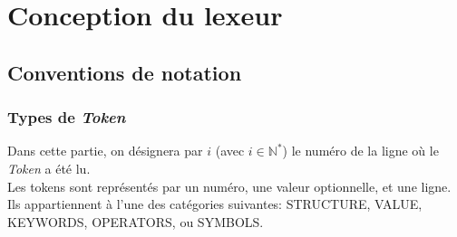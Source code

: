\documentclass[a4paper, 12pt]{report}
\begin{document}

\chapter{Conception du lexeur}

\section{Conventions de notation}

\subsection{Types de \textit{Token}}

Dans cette partie, on désignera par $i$ (avec $i \in \mathbb{N}^*$) le numéro de la ligne où le \textit{Token} a été lu.\\

Les tokens sont représentés par un numéro, une valeur optionnelle, et une ligne. Ils appartiennent à l'une des catégories suivantes: STRUCTURE, VALUE, KEYWORDS, OPERATORS, ou SYMBOLS.\\
\end{document}
